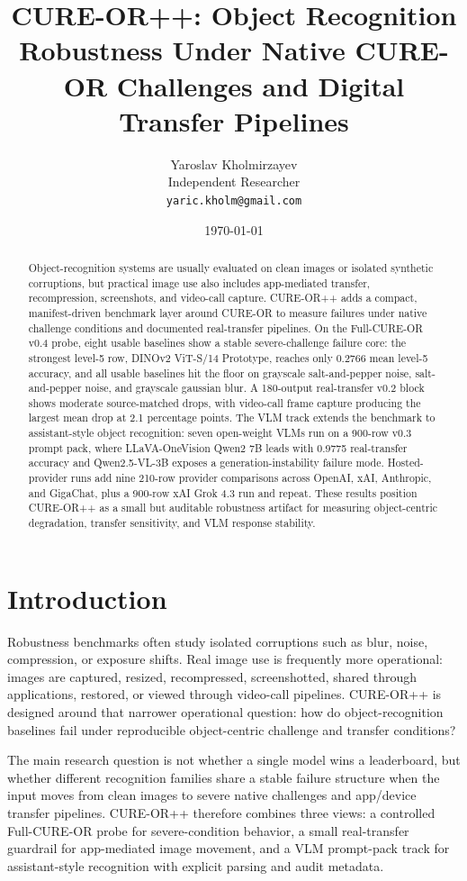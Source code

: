 \documentclass[10pt]{article}
\title{CURE-OR++: Object Recognition Robustness Under Native CURE-OR Challenges and Digital Transfer Pipelines}
\author{Yaroslav Kholmirzayev\\Independent Researcher\\\texttt{yaric.kholm@gmail.com}}
\date{\today}
\begin{document}
\maketitle

\begin{abstract}
Object-recognition systems are usually evaluated on clean images or isolated synthetic corruptions, but practical image use also includes app-mediated transfer, recompression, screenshots, and video-call capture. CURE-OR++ adds a compact, manifest-driven benchmark layer around CURE-OR to measure failures under native challenge conditions and documented real-transfer pipelines. On the Full-CURE-OR v0.4 probe, eight usable baselines show a stable severe-challenge failure core: the strongest level-5 row, DINOv2 ViT-S/14 Prototype, reaches only 0.2766 mean level-5 accuracy, and all usable baselines hit the floor on grayscale salt-and-pepper noise, salt-and-pepper noise, and grayscale gaussian blur. A 180-output real-transfer v0.2 block shows moderate source-matched drops, with video-call frame capture producing the largest mean drop at 2.1 percentage points. The VLM track extends the benchmark to assistant-style object recognition: seven open-weight VLMs run on a 900-row v0.3 prompt pack, where LLaVA-OneVision Qwen2 7B leads with 0.9775 real-transfer accuracy and Qwen2.5-VL-3B exposes a generation-instability failure mode. Hosted-provider runs add nine 210-row provider comparisons across OpenAI, xAI, Anthropic, and GigaChat, plus a 900-row xAI Grok 4.3 run and repeat. These results position CURE-OR++ as a small but auditable robustness artifact for measuring object-centric degradation, transfer sensitivity, and VLM response stability.
\end{abstract}

\section{Introduction}

Robustness benchmarks often study isolated corruptions such as blur, noise, compression, or exposure shifts. Real image use is frequently more operational: images are captured, resized, recompressed, screenshotted, shared through applications, restored, or viewed through video-call pipelines. CURE-OR++ is designed around that narrower operational question: how do object-recognition baselines fail under reproducible object-centric challenge and transfer conditions?

The main research question is not whether a single model wins a leaderboard, but whether different recognition families share a stable failure structure when the input moves from clean images to severe native challenges and app/device transfer pipelines. CURE-OR++ therefore combines three views: a controlled Full-CURE-OR probe for severe-condition behavior, a small real-transfer guardrail for app-mediated image movement, and a VLM prompt-pack track for assistant-style recognition with explicit parsing and audit metadata.
\end{document}
